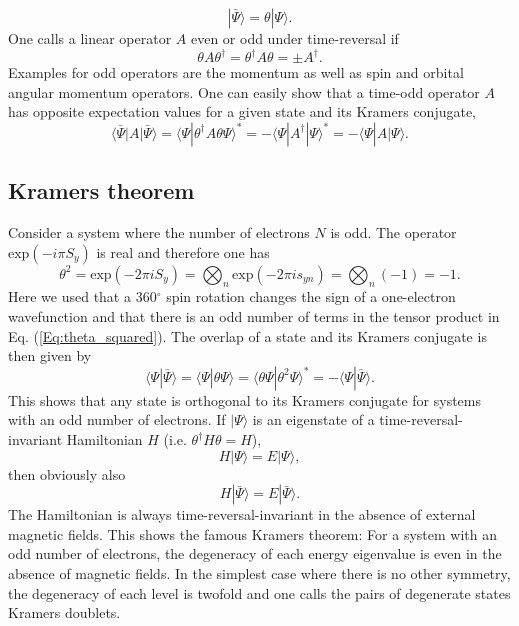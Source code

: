 \begin{equation}
|\bar\Psi\rangle = \theta |\Psi\rangle.
\end{equation}
One calls a linear operator $A$ even or odd under time-reversal if
\begin{equation}
\theta A \theta^\dagger = \theta^\dagger A \theta = \pm A^\dagger.
\end{equation}
Examples for odd operators are the momentum as well as spin and orbital angular momentum operators.
One can easily show that a time-odd operator $A$ has opposite expectation values for a given state and its Kramers conjugate,
\begin{equation}
\langle \bar\Psi|A|\bar\Psi\rangle = \langle \Psi|\theta^\dagger A \theta \Psi\rangle^\ast = - \langle \Psi|A^\dagger|\Psi\rangle^\ast = - \langle \Psi | A | \Psi\rangle.
\end{equation}

\subsection{Kramers theorem}
\label{Sec:Kramers}
Consider a system where the number of electrons $N$ is odd. The operator $\text{exp}(-i\pi S_y)$ is real and therefore one has
\begin{equation}
\label{Eq:theta_squared}
\theta^2 = \text{exp}(-2\pi i S_y) = \bigotimes_n \text{exp}(-2\pi i s_{yn}) = \bigotimes_n (-1) = -1.
\end{equation}
Here we used that a 360$^\circ$ spin rotation changes the sign of a one-electron wavefunction and that there is an odd number of terms in the tensor product in Eq. (\ref{Eq:theta_squared}).
The overlap of a state and its Kramers conjugate is then given by
\begin{equation}
\langle \Psi|\bar\Psi\rangle = \langle \Psi|\theta \Psi\rangle = \langle\theta \Psi | \theta^2\Psi\rangle^\ast = - \langle \Psi|\bar\Psi\rangle.
\end{equation}
This shows that any state is orthogonal to its Kramers conjugate for systems with an odd number of electrons. If $|\Psi\rangle$ is an eigenstate of a time-reversal-invariant Hamiltonian $H$ (i.e. $\theta^\dagger H \theta = H$),
\begin{equation}
H|\Psi\rangle = E|\Psi\rangle,
\end{equation}
then obviously also
\begin{equation}
H|\bar\Psi\rangle = E|\bar\Psi\rangle.
\end{equation}
The Hamiltonian is always time-reversal-invariant in the absence of external magnetic fields.
This shows the famous Kramers theorem: For a system with an odd number of electrons, the degeneracy of each energy eigenvalue is even in the absence of magnetic fields. In the simplest case where there is no other symmetry, the degeneracy of each level is twofold and one calls the pairs of degenerate states Kramers doublets.

